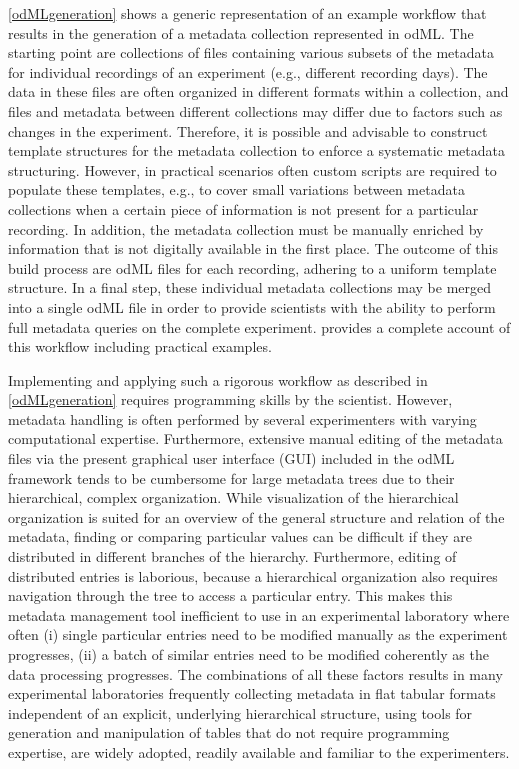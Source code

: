 \cref{odMLgeneration} shows a generic representation of an example workflow that results in the generation of a metadata collection represented in odML. The starting point are collections of files containing various subsets of the metadata for individual recordings of an experiment (e.g., different recording days). The data in these files are often organized in different formats within a collection, and files and metadata between different collections may differ due to factors such as changes in the experiment. Therefore, it is possible and advisable to construct template structures for the metadata collection to enforce a systematic metadata structuring. However, in practical scenarios often custom scripts are required to populate these templates, e.g., to cover small variations between metadata collections when a certain piece of information is not present for a particular recording. In addition, the metadata collection must be manually enriched by information that is not digitally available in the first place. The outcome of this build process are odML files for each recording, adhering to a uniform template structure. In a final step, these individual metadata collections may be merged into a single odML file in order to provide scientists with the ability to perform full metadata queries on the complete experiment. \citet{Zehl_2016} provides a complete account of this workflow including practical examples.

Implementing and applying such a rigorous workflow as described in \cref{odMLgeneration} requires programming skills by the scientist. However, metadata handling is often performed by several experimenters with varying computational expertise. Furthermore, extensive manual editing of the metadata files via the present graphical user interface (GUI) included in the odML framework tends to be cumbersome for large metadata trees due to their hierarchical, complex organization. While visualization of the hierarchical organization is suited for an overview of the general structure and relation of the metadata, finding or comparing particular values can be difficult if they are distributed in different branches of the hierarchy. Furthermore, editing of distributed entries is laborious, because a hierarchical organization also requires navigation through the tree to access a particular entry. This makes this metadata management tool inefficient to use in an experimental laboratory where often (i) single particular entries need to be modified manually as the experiment progresses, (ii) a batch of similar entries need to be modified coherently as the data processing progresses. The combinations of all these factors results in many experimental laboratories frequently collecting metadata in flat tabular formats independent of an explicit, underlying hierarchical structure, using tools for generation and manipulation of tables that do not require programming expertise, are widely adopted, readily available and familiar to the experimenters.


